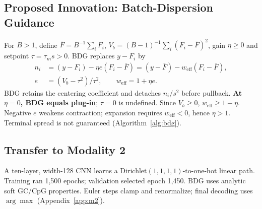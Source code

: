 \documentclass{article}
\newcommand{\Fbar}{\bar F}
\newcommand{\Vb}{V_b}
\newcommand{\weff}{w_{\mathrm{eff}}}
\begin{document}
\subsection{Proposed Innovation: Batch-Dispersion Guidance}\label{sec:bdg}
For $B>1$, define $\Fbar=B^{-1}\sum_iF_i$, $\Vb=(B-1)^{-1}\sum_i(F_i-\Fbar)^2$, gain $\eta\ge0$ and setpoint $\tau=\tau_m s>0$. BDG replaces $y-F_i$ by
\begin{equation}
\begin{aligned}
n_i&=(y-F_i)-\eta e(F_i-\Fbar)=(y-\Fbar)-\weff(F_i-\Fbar),\\
e&=(\Vb-\tau^2)/\tau^2,\qquad \weff=1+\eta e.
\end{aligned}\label{eq:bdg}
\end{equation}
BDG retains the centering coefficient and detaches $n_i/s^2$ before pullback. \textbf{At $\eta=0$, BDG equals plug-in}; $\tau=0$ is undefined. Since $V_b\ge0$, $\weff\ge1-\eta$. Negative $e$ weakens contraction; expansion requires $\weff<0$, hence $\eta>1$. Terminal spread is not guaranteed (Algorithm~\ref{alg:bdg}).

\subsection{Transfer to Modality 2}\label{sec:transfer}
A ten-layer, width-128 CNN learns a Dirichlet$(1,1,1,1)$-to-one-hot linear path. Training ran 1,500 epochs; validation selected epoch 1,450. BDG uses analytic soft GC/CpG properties. Euler steps clamp and renormalize; final decoding uses $\arg\max$ (Appendix~\ref{app:m2}).
\end{document}
